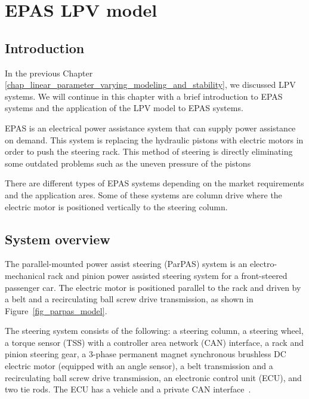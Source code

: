 \chapter{EPAS LPV model}
\label{chap_epas_lpv_model} 

\section{Introduction}

In the previous Chapter \ref{chap_linear_parameter_varying_modeling_and_stability}, we discussed LPV systems. We will continue in this chapter with a brief introduction to EPAS systems and the application of the LPV model to EPAS systems.

EPAS is an electrical power assistance system that can supply power assistance on demand. This system is replacing the hydraulic pistons with electric motors in order to push the steering rack. This method of steering is directly eliminating some outdated problems such as the uneven pressure of the pistons





There are different types of EPAS systems depending on the market requirements and the application ares. Some of these systems are column drive where the electric motor is positioned vertically to the steering column.

\section{System overview}
\label{sec_system_overview}

The parallel-mounted power assist steering (ParPAS) system is an electro-mechanical rack and pinion power assisted steering system for a front-steered passenger car. The electric motor is positioned parallel to the rack and driven by a belt and a recirculating ball screw drive transmission, as shown in Figure~\ref{fig_parpas_model}.

The steering system consists of the following: a steering column, a steering wheel, a torque sensor (TSS) with a controller area network (CAN) interface, a rack and pinion steering gear, a 3-phase permanent magnet synchronous brushless DC electric motor (equipped with an angle sensor), a belt transmission and a recirculating ball screw drive transmission, an electronic control unit (ECU), and two tie rods. The ECU has a vehicle and a private CAN interface~\citep{paholics2006epas}.

